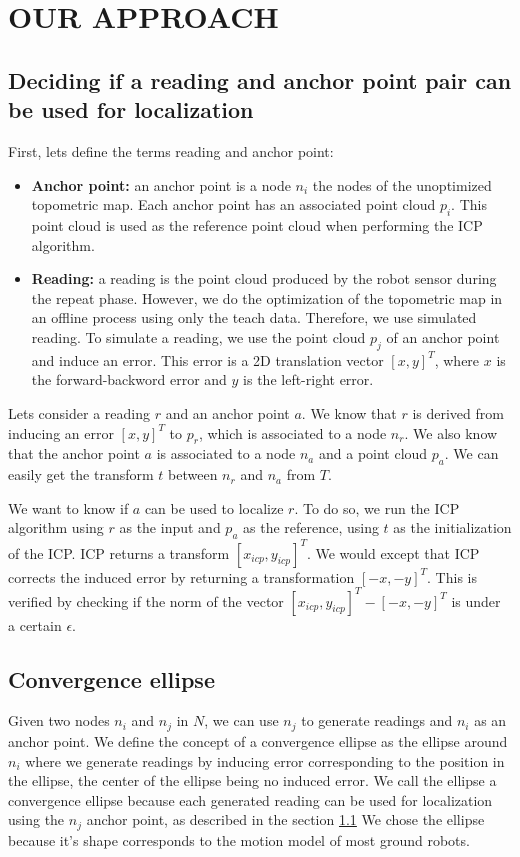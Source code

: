 \documentclass[letterpaper,10 pt,conference]{ieeeconf}
\begin{document}
\section{OUR APPROACH}
\label{approach}

\subsection{Deciding if a reading and anchor point pair can be used for localization}
\label{approach-deciding-converge}

First, lets define the terms reading and anchor point:

\begin{itemize}
  \item \textbf{Anchor point:} an anchor point is a node $n_i$ the nodes of the unoptimized
    topometric map. Each anchor point has an associated point cloud $p_i$. This point cloud is used
    as the reference point cloud when performing the ICP algorithm.
  \item \textbf{Reading:} a reading is the point cloud produced by the robot sensor during the
    repeat phase. However, we do the optimization of the topometric map in an offline process using
only the teach data. Therefore, we use simulated reading. To simulate a reading, we use the point
cloud $p_j$ of an anchor point and induce an error. This error is a 2D translation vector $[x,y]^T$, where $x$ is the forward-backword error and $y$ is the left-right error.
\end{itemize}

Lets consider a reading $r$ and an anchor point $a$. We know that $r$ is derived from inducing an error $[x, y]^T$ to $p_r$, which is associated to a node $n_r$.
We also know that the anchor point $a$ is associated to a node $n_a$ and a point cloud $p_a$. We can easily get the transform $t$ between $n_r$ and $n_a$ from $T$.


We want to know if $a$ can be used to localize $r$. To do so, we run the ICP algorithm using $r$ as the input and $p_a$ as the reference, using $t$
as the initialization of the ICP. ICP returns a transform $[x_{icp}, y_{icp}]^T$. We would except that ICP corrects the induced error by returning
a transformation $[-x, -y]^T$. This is verified by checking if the norm of the vector $[x_{icp}, y_{icp}]^T - [-x, -y]^T$ is under a certain $\epsilon$.


\subsection{Convergence ellipse}
Given two nodes $n_i$ and $n_j$ in $N$, we can use $n_j$ to generate readings and $n_i$ as an anchor
point.  We define the concept of a convergence ellipse as the ellipse around $n_i$ where we generate
readings by inducing error corresponding to the position in the ellipse, the center of the ellipse
being no induced error. We call the ellipse a convergence ellipse because each generated reading can
be used for localization using the $n_j$ anchor point, as described in the section
\ref{approach-deciding-converge} We chose the ellipse because it's shape corresponds to the motion model of most ground robots.
\end{document}
